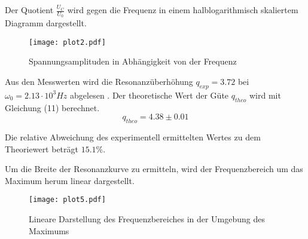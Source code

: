 Der Quotient $\frac{U_C}{U_0}$ wird gegen die Frequenz in einem halblogarithmisch skaliertem Diagramm
dargestellt.


\begin{figure}[H]
  \centering
  \texttt{[image: plot2.pdf]}
  \caption{Spannungsamplituden in Abhängigkeit von der Frequenz}
  \label{fig:plot2}
\end{figure}

Aus den Messwerten wird die Resonanzüberhöhung $q_{exp} = 3.72$ bei $\omega_0 = 2.13 \cdot 10^{3}Hz$ abgelesen . Der theoretische Wert der
Güte $q_{theo}$ wird mit Gleichung (11) berechnet.
\begin{equation*}
  q_{theo} = 4.38 \pm 0.01
\end{equation*}

Die relative Abweichung des experimentell ermittelten Wertes zu dem Theoriewert beträgt $15.1\%$.

Um die Breite der Resonanzkurve zu ermitteln, wird der Frequenzbereich um das Maximum herum linear dargestellt.

\begin{figure}[H]
  \centering
  \texttt{[image: plot5.pdf]}
  \caption{Lineare Darstellung des Frequenzbereiches in der Umgebung des Maximums}
  \label{fig:plot5}
\end{figure}
